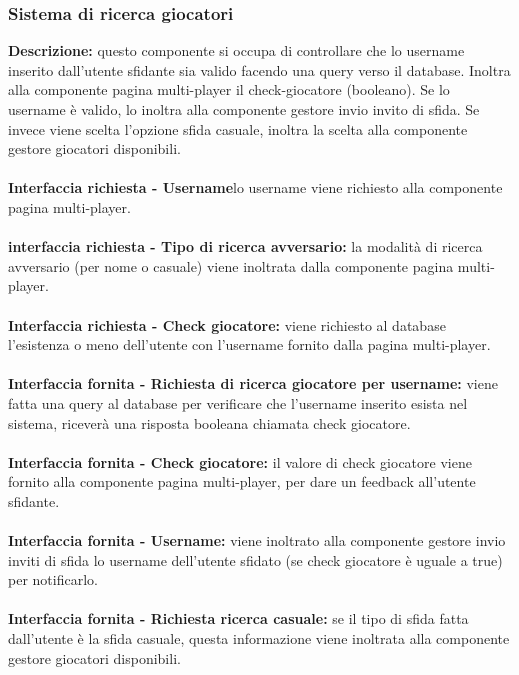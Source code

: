 \subsubsection{Sistema di ricerca giocatori}
\textbf{Descrizione: }questo componente si occupa di controllare che lo username inserito dall'utente sfidante sia valido facendo una query verso il database. Inoltra alla componente pagina multi-player il check-giocatore (booleano). Se lo username è valido, lo inoltra alla componente gestore invio invito di sfida. Se invece viene scelta l'opzione sfida casuale, inoltra la scelta alla componente gestore giocatori disponibili.\\
\\
\textbf{Interfaccia richiesta - Username}lo username viene richiesto alla componente pagina multi-player.\\
\\
\textbf{interfaccia richiesta - Tipo di ricerca avversario: }la modalità di ricerca avversario (per nome o casuale) viene inoltrata dalla componente pagina multi-player.\\
\\
\textbf{Interfaccia richiesta - Check giocatore: }viene richiesto al database l'esistenza o meno dell'utente con l'username fornito dalla pagina multi-player.\\
\\
\textbf{Interfaccia fornita - Richiesta di ricerca giocatore per username: }viene fatta una query al database per verificare che l'username inserito esista nel sistema, riceverà una risposta booleana chiamata check giocatore.\\
\\
\textbf{Interfaccia fornita - Check giocatore: }il valore di check giocatore viene fornito alla componente pagina multi-player, per dare un feedback all'utente sfidante.\\
\\
\textbf{Interfaccia fornita - Username: }viene inoltrato alla componente gestore invio inviti di sfida lo username dell'utente sfidato (se check giocatore è uguale a true) per notificarlo.\\
\\
\textbf{Interfaccia fornita - Richiesta ricerca casuale: }se il tipo di sfida fatta dall'utente è la sfida casuale, questa informazione viene inoltrata alla componente gestore giocatori disponibili.\\

